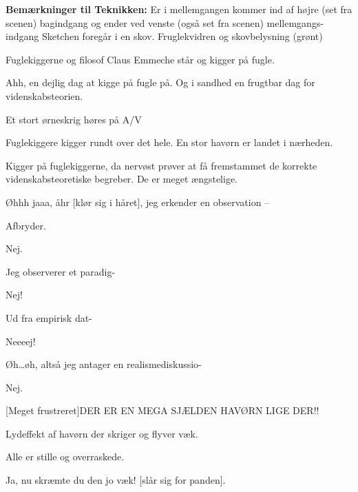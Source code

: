 \documentclass[a4paper,12pt]{article}
\begin{document}
\begin{sketch}



\scene \textbf{Bemærkninger til Teknikken:}
Er i mellemgangen kommer ind af højre (set fra scenen) bagindgang og ender ved venste (også set fra scenen) mellemgangs-indgang
Sketchen foregår i en skov. Fruglekvidren og skovbelysning (grønt)



\scene Fuglekiggerne og filosof Claus Emmeche står og kigger på fugle. 

Ahh, en dejlig dag at kigge på fugle på. Og i sandhed en frugtbar dag for videnskabsteorien.

Et stort ørneskrig høres på A/V

\scene Fuglekiggere kigger rundt over det hele. En stor havørn er landet i nærheden.

\scene Kigger på fuglekiggerne, da nervøst prøver at få fremstammet de korrekte videnskabsteoretiske begreber. De er meget ængstelige.

Øhhh jaaa, åhr [klør sig i håret], jeg erkender en observation -- 

Afbryder.

Nej.

Jeg observerer et paradig-

Nej!

Ud fra empirisk dat-

Neeeej!


Øh\ldots øh, altså jeg antager en realismediskussio-

Nej.

[Meget frustreret]DER ER EN MEGA SJÆLDEN HAVØRN LIGE DER!!

Lydeffekt af havørn der skriger og flyver væk.

\scene Alle er stille og overraskede.

Ja, nu skræmte du den jo væk! [slår sig for panden].



\end{sketch}
\end{document}
